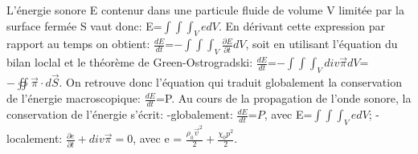 \documentclass[a4paper, 12pt]{article}
\begin{document}
\begin{text}
L'énergie sonore E contenur dans une particule fluide de volume V limitée par la surface fermée S vaut donc:\newline
E=$\int\int\int_{V}edV$. \newline 
En dérivant cette expression par rapport au temps on obtient: 
$\frac{dE}{dt}$=$-\int\int\int_{V}\frac{\partial E}{\partial t}dV$,\newline 
soit en utilisant l'équation du bilan loclal et le théorème de Green-Ostrogradski:\newline 
$\frac{dE}{dt}$=$-\int\int\int_{V}div \vec \pi dV$= $-\oiint \vec \pi \cdot d\vec S$.\newline 
On retrouve donc l'équation qui traduit globalement la conservation de l'énergie macroscopique:\newline 
$\frac{dE}{dt}$=P.\newline 
Au cours de la propagation de l'onde sonore, la conservation de l'énergie s'écrit:\newline 
-globalement: $\frac{dE}{dt}$=$P$, avec E=$\int\int\int_{V}edV$;\newline 
-localement: $\frac{\partial e}{\partial t}+div \vec \pi = 0$, avec e = $\frac{\rho_{0}\vec v^{2}}{2}+\frac{\chi_{0}p^{2}}{2}$.
\end{text}
\end{document}
